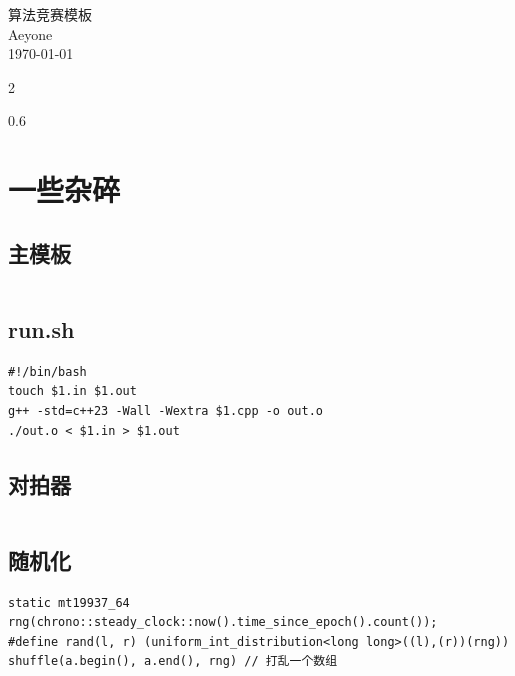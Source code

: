 \documentclass[a4paper]{article}
\begin{document}
\hypersetup{pageanchor=false}
\begin{titlepage}
\thispagestyle{empty}
\vspace*{\fill}
\begin{center}
    {\Huge 算法竞赛模板}\\[1cm]
    {\Large Aeyone}\\[0.5cm]
    {\large \today}
\end{center}
\vspace*{\fill}
\end{titlepage}
\hypersetup{pageanchor=true}

\tableofcontents
\newpage
\begin{multicols}{2}
\begin{spacing}{0.6}

\section{一些杂碎}

\subsection{主模板}
\inputminted{cpp}{\detokenize{Template/一些杂碎/01 - main.txt}}

\subsection{run.sh}
\begin{verbatim}
#!/bin/bash
touch $1.in $1.out
g++ -std=c++23 -Wall -Wextra $1.cpp -o out.o
./out.o < $1.in > $1.out
\end{verbatim}

\subsection{对拍器}
\inputminted{cpp}{\detokenize{src/Debug/run.cpp}}

\columnbreak

\subsection{随机化}
\begin{verbatim}
static mt19937_64 rng(chrono::steady_clock::now().time_since_epoch().count());
#define rand(l, r) (uniform_int_distribution<long long>((l),(r))(rng))
shuffle(a.begin(), a.end(), rng) // 打乱一个数组
\end{verbatim}


\end{spacing}
\end{multicols}
\end{document}
